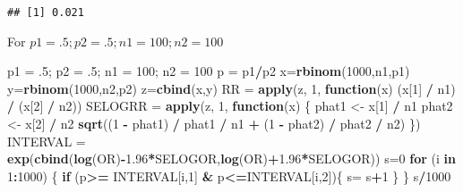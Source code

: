 \documentclass[]{article}
\newenvironment{Shaded}{\begin{snugshade}}{\end{snugshade}}
\newcommand{\KeywordTok}[1]{\textcolor[rgb]{0.13,0.29,0.53}{\textbf{#1}}}
\newcommand{\DecValTok}[1]{\textcolor[rgb]{0.00,0.00,0.81}{#1}}
\newcommand{\FloatTok}[1]{\textcolor[rgb]{0.00,0.00,0.81}{#1}}
\newcommand{\StringTok}[1]{\textcolor[rgb]{0.31,0.60,0.02}{#1}}
\newcommand{\ControlFlowTok}[1]{\textcolor[rgb]{0.13,0.29,0.53}{\textbf{#1}}}
\newcommand{\OperatorTok}[1]{\textcolor[rgb]{0.81,0.36,0.00}{\textbf{#1}}}
\newcommand{\NormalTok}[1]{#1}
\begin{document}
\begin{verbatim}
## [1] 0.021
\end{verbatim}

For \(p1 = .5; p2 = .5; n1 = 100; n2 = 100\)

\begin{Shaded}
\begin{Highlighting}[]
\NormalTok{p1 =}\StringTok{ }\NormalTok{.}\DecValTok{5}\NormalTok{; p2 =}\StringTok{ }\NormalTok{.}\DecValTok{5}\NormalTok{; n1 =}\StringTok{ }\DecValTok{100}\NormalTok{; n2 =}\StringTok{ }\DecValTok{100}
\NormalTok{p =}\StringTok{ }\NormalTok{p1}\OperatorTok{/}\NormalTok{p2}
\NormalTok{x=}\KeywordTok{rbinom}\NormalTok{(}\DecValTok{1000}\NormalTok{,n1,p1)}
\NormalTok{y=}\KeywordTok{rbinom}\NormalTok{(}\DecValTok{1000}\NormalTok{,n2,p2)}
\NormalTok{z=}\KeywordTok{cbind}\NormalTok{(x,y)}
\NormalTok{RR =}\StringTok{ }\KeywordTok{apply}\NormalTok{(z, }\DecValTok{1}\NormalTok{,}
\ControlFlowTok{function}\NormalTok{(x) (x[}\DecValTok{1}\NormalTok{] }\OperatorTok{/}\StringTok{ }\NormalTok{n1) }\OperatorTok{/}\StringTok{ }\NormalTok{(x[}\DecValTok{2}\NormalTok{] }\OperatorTok{/}\StringTok{ }\NormalTok{n2))}
\NormalTok{SELOGRR =}\StringTok{ }\KeywordTok{apply}\NormalTok{(z, }\DecValTok{1}\NormalTok{,}
\ControlFlowTok{function}\NormalTok{(x) \{}
\NormalTok{phat1 <-}\StringTok{ }\NormalTok{x[}\DecValTok{1}\NormalTok{] }\OperatorTok{/}\StringTok{ }\NormalTok{n1}
\NormalTok{phat2 <-}\StringTok{ }\NormalTok{x[}\DecValTok{2}\NormalTok{] }\OperatorTok{/}\StringTok{ }\NormalTok{n2}
\KeywordTok{sqrt}\NormalTok{((}\DecValTok{1} \OperatorTok{-}\StringTok{ }\NormalTok{phat1) }\OperatorTok{/}\StringTok{ }\NormalTok{phat1 }\OperatorTok{/}\StringTok{ }\NormalTok{n1 }\OperatorTok{+}\StringTok{ }\NormalTok{(}\DecValTok{1} \OperatorTok{-}\StringTok{ }\NormalTok{phat2) }\OperatorTok{/}\StringTok{ }\NormalTok{phat2 }\OperatorTok{/}\StringTok{ }\NormalTok{n2)}
\NormalTok{\})}
\NormalTok{INTERVAL =}\StringTok{ }\KeywordTok{exp}\NormalTok{(}\KeywordTok{cbind}\NormalTok{(}\KeywordTok{log}\NormalTok{(OR)}\OperatorTok{-}\FloatTok{1.96}\OperatorTok{*}\NormalTok{SELOGOR,}\KeywordTok{log}\NormalTok{(OR)}\OperatorTok{+}\FloatTok{1.96}\OperatorTok{*}\NormalTok{SELOGOR))}
\NormalTok{s=}\DecValTok{0}
\ControlFlowTok{for}\NormalTok{ (i }\ControlFlowTok{in} \DecValTok{1}\OperatorTok{:}\DecValTok{1000}\NormalTok{) \{}
  \ControlFlowTok{if}\NormalTok{ (p}\OperatorTok{>=}\StringTok{ }\NormalTok{INTERVAL[i,}\DecValTok{1}\NormalTok{] }\OperatorTok{&}\StringTok{ }\NormalTok{p}\OperatorTok{<=}\NormalTok{INTERVAL[i,}\DecValTok{2}\NormalTok{])\{}
\NormalTok{    s=}\StringTok{ }\NormalTok{s}\OperatorTok{+}\DecValTok{1}
\NormalTok{  \}}
\NormalTok{\}}
\NormalTok{s}\OperatorTok{/}\DecValTok{1000}
\end{Highlighting}
\end{Shaded}
\end{document}
